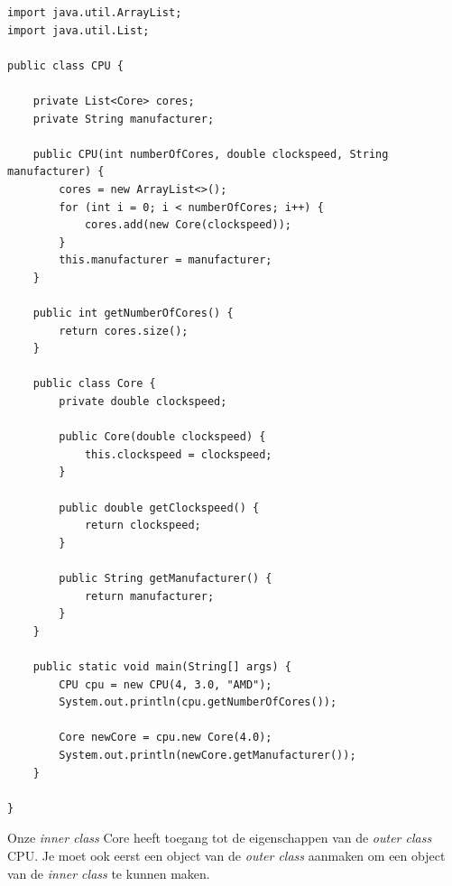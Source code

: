 \documentclass{tstextbook}
\begin{document}
\begin{lstlisting}
import java.util.ArrayList;
import java.util.List;

public class CPU {

	private List<Core> cores;
	private String manufacturer;

	public CPU(int numberOfCores, double clockspeed, String manufacturer) {
		cores = new ArrayList<>();
		for (int i = 0; i < numberOfCores; i++) {
			cores.add(new Core(clockspeed));
		}
		this.manufacturer = manufacturer;
	}

	public int getNumberOfCores() {
		return cores.size();
	}

	public class Core {
		private double clockspeed;

		public Core(double clockspeed) {
			this.clockspeed = clockspeed;
		}

		public double getClockspeed() {
			return clockspeed;
		}

		public String getManufacturer() {
			return manufacturer;
		}
	}

	public static void main(String[] args) {
		CPU cpu = new CPU(4, 3.0, "AMD");
		System.out.println(cpu.getNumberOfCores());

		Core newCore = cpu.new Core(4.0);
		System.out.println(newCore.getManufacturer());
	}

}
\end{lstlisting}

Onze \textit{inner class} Core heeft toegang tot de eigenschappen van de \textit{outer class} CPU. Je moet ook eerst een object van de \textit{outer class} aanmaken om een object van de \textit{inner class} te kunnen maken.
\end{document}
